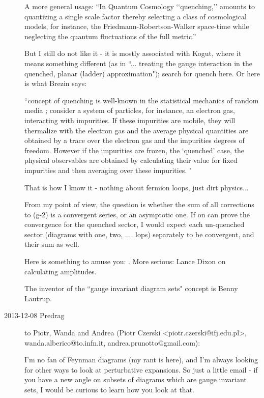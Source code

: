 \begin{description}
A more general usage: ``In Quantum Cosmology ‘‘quenching,’’ amounts to
quantizing a single scale factor thereby selecting a class of
cosmological models, for instance, the Friedmann-Robertson-Walker
space-time while neglecting the quantum fluctuations of the full
metric.''

But I still do not like it - it is mostly associated with Kogut, where it
means something different (as in ``... treating the gauge interaction in
the quenched, planar (ladder) approximation"); search for quench
 {here}. Or
here is what Brezin says:

``concept of quenching is well-known in the statistical mechanics of
random media ; consider a system of particles, for instance, an electron
gas, interacting with impurities. If these impurities are mobile, they
will thermalize with the electron gas and the average physical quantities
are obtained by a trace over the electron gas and the impurities degrees
of freedom. However if the impurities are frozen, the `quenched' case,
the physical observables are obtained by calculating their value for
fixed impurities and then averaging over these
impurities. "

That is how I know it - nothing about fermion loops, just dirt physics...

From my point of view, the question is whether the sum of all
corrections to (g-2) is a convergent series, or an asymptotic one.
If on can prove the convergence for the quenched sector, I would
expect each un-quenched sector (diagrams with one, two, .... lops)
separately to be convergent, and their sum as well.

Here is something to amuse you:
.
More serious: Lance Dixon
{on calculating amplitudes}.

The inventor of the ``gauge invariant diagram sets" concept is Benny
Lautrup.

\item[2013-12-08  Predrag] to Piotr, Wanda and Andrea
(Piotr Czerski <piotr.czerski@ifj.edu.pl>,
 wanda.alberico@to.infn.it,
 andrea.prunotto@gmail.com):

I'm no fan of Feynman diagrams (my rant is
{here}), and I'm always looking
for other ways to look at perturbative expansions. So just a little email
- if you have a new angle on subsets of diagrams which are gauge
invariant sets, I would be curious to learn how you look at that.


\end{description}
